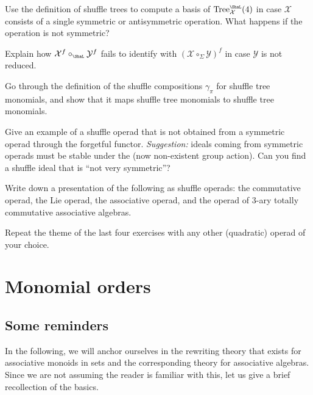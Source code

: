 \documentclass[fleqn, a4paper, twoside]{article}
\newcommand{\Sha}{{\scaleobj{0.75}{\ShaL}}}
\newcommand{\0}{\langle 0\rangle}
\newcommand{\XX}{\mathcal{X}}
\newcommand{\YY}{\mathcal{Y}}
\DeclareRobustCommand{\[}{\begin{equation}}%
\DeclareRobustCommand{\]}{\end{equation}}%
\theoremstyle{mytheorem}
\theoremstyle{introthm}
\theoremstyle{mydefinition}
\theoremstyle{mydefinition2}
\theoremstyle{plain} %
\newcommand{\?}{\,?\,}
\theoremstyle{mytheorem}
\theoremstyle{plain} %
\begin{document}
\begin{question}
Use the definition of shuffle trees
to compute a basis
of $\mathrm{Tree}_\XX^\Sha(4)$ in case $\XX$ consists
of a single symmetric or antisymmetric
operation. What happens if the operation
is not symmetric?
\end{question}

\begin{question} Explain how 
$\XX^f \circ_\Sha \YY^f$ fails
 to identify with  $(\XX\circ_\Sigma \YY)^f$ 
 in case $\YY$ is
 not reduced. 
\end{question}

\begin{question}
Go through the definition of the shuffle
compositions $\gamma_\pi$ for shuffle
tree monomials, and show that it maps
shuffle tree monomials to shuffle tree
monomials.
\end{question}

\begin{question} 
Give an example of a shuffle operad that
is not obtained from a symmetric operad
through the forgetful functor. \emph{Suggestion:}
ideals coming from symmetric operads must be
stable under the (now non-existent group action).
Can you find a shuffle ideal that is ``not very
symmetric''?
\end{question}

\begin{question}
Write down a presentation of the following as
shuffle operads: the  
commutative operad, the
Lie operad, the
associative operad, and the
operad of $3$-ary totally commutative
associative algebras.
\end{question}

\begin{question}
Repeat the theme of the last four exercises
with any other (quadratic) operad
of your choice.
\end{question}

\newpage
\section{Monomial orders}


\subsection{Some reminders}

In the following, we will anchor ourselves in the 
rewriting theory that exists for associative monoids
in sets and the corresponding theory for
associative algebras. Since we are not assuming
the reader is familiar with this, let us give
a brief recollection of the basics.
\end{document}
